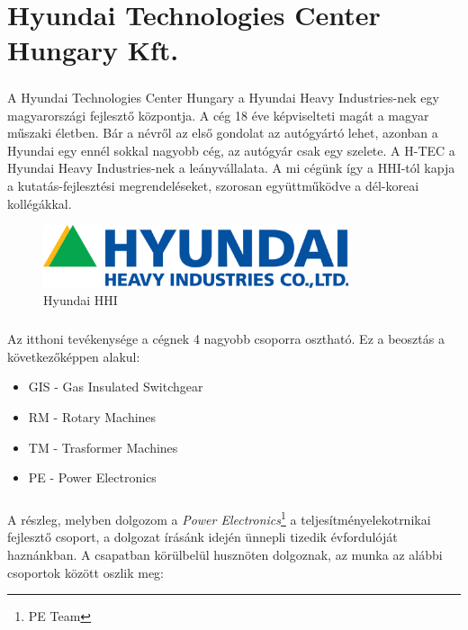 \chapter*{Hyundai Technologies Center Hungary Kft.}

\paragraph{}
A Hyundai Technologies Center Hungary a Hyundai Heavy Industries-nek egy magyarországi fejlesztő központja. A cég 18 éve képviselteti magát a magyar műszaki életben. Bár a névről az első gondolat az autógyártó lehet, azonban a Hyundai egy ennél sokkal nagyobb cég, az autógyár csak egy szelete. A H-TEC a Hyundai Heavy Industries-nek a leányvállalata. A mi cégünk így a HHI-tól kapja a kutatás-fejlesztési megrendeléseket, szorosan együttműködve a dél-koreai kollégákkal.

\begin{figure}[h]
	\centering
	\includegraphics[width = 0.8\textwidth]{figures/hyundai_logo.png}
	\caption{Hyundai HHI} 
	\label{fig:hhi}
\end{figure}

\paragraph{}
Az itthoni tevékenysége a cégnek 4 nagyobb csoporra osztható. Ez a beosztás a következőképpen alakul:


\begin{itemize}
	\item{GIS - Gas Insulated Switchgear}
	\item{RM - Rotary Machines}
	\item{TM - Trasformer Machines}
	\item{PE - Power Electronics}
\end{itemize}


\paragraph{}
A részleg, melyben dolgozom a \emph{Power Electronics}\footnote{PE Team} a teljesítményelekotrnikai fejlesztő csoport, a dolgozat írásánk idején ünnepli tizedik évfordulóját haznánkban. A csapatban körülbelül husznöten dolgoznak, az munka az alábbi csoportok között oszlik meg:

